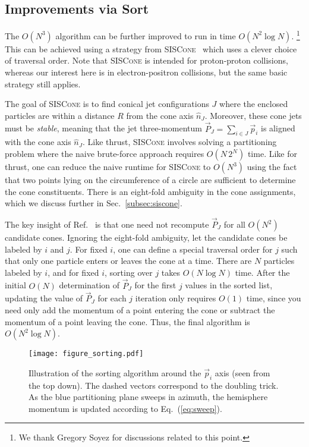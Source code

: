 \documentclass[aps,prd,twocolumn,superscriptaddress,preprintnumbers,nofootinbib,longbibliography,floatfix]{revtex4-1}
\DeclareRobustCommand{\Sec}[1]{Sec.~\ref{#1}}
\DeclareRobustCommand{\Eq}[1]{Eq.~(\ref{#1})}
\DeclareRobustCommand{\Ref}[1]{Ref.~\cite{#1}}
\begin{document}
\subsection{Improvements via Sort}
\label{sec:classical_sort}

The $O(N^3)$ algorithm can be further improved to run in time $O(N^2\log N)$.%
%
\footnote{We thank Gregory Soyez for discussions related to this point.}
%
This can be achieved using a strategy from \textsc{SISCone}~\cite{Salam:2007xv} which uses a clever choice of traversal order.
%
Note that \textsc{SISCone} is intended for proton-proton collisions, whereas our interest here is in electron-positron collisions, but the same basic strategy still applies.


The goal of \textsc{SISCone} is to find conical jet configurations $J$ where the enclosed particles are within a distance $R$ from the cone axis $\hat{n}_J$.
%
Moreover, these cone jets must be \emph{stable}, meaning that the jet three-momentum $\vec{P}_{J} = \sum_{i \in J} \vec{p}_i$ is aligned with the cone axis $\hat{n}_J$.
%
Like thrust, \textsc{SISCone} involves solving a partitioning problem where the naive brute-force approach requires $O(N \, 2^N)$ time.
%
Like for thrust, one can reduce the naive runtime for \textsc{SISCone} to $O(N^3)$ using the fact that two points lying on the circumference of a circle are sufficient to determine the cone constituents.
%
There is an eight-fold ambiguity in the cone assignments, which we discuss further in \Sec{subsec:siscone}.


The key insight of \Ref{Salam:2007xv} is that one need not recompute $\vec{P}_{J}$ for all $O(N^2)$ candidate cones.
%
Ignoring the eight-fold ambiguity, let the candidate cones be labeled by $i$ and $j$.
%
For fixed $i$, one can define a special traversal order for $j$ such that only one particle enters or leaves the cone at a time.
%
There are $N$ particles labeled by $i$, and for fixed $i$, sorting over $j$ takes $O(N \log N)$ time.
%
After the initial $O(N)$ determination of $\vec{P}_{J}$ for the first $j$ values in the sorted list, updating the value of $\vec{P}_{J}$ for each $j$ iteration only requires $O(1)$ time, since you need only add the momentum of a point entering the cone or subtract the momentum of a point leaving the cone.
%
Thus, the final algorithm is $O(N^2 \log N)$.


\begin{figure}
\texttt{[image: figure\_sorting.pdf]}
\caption{Illustration of the sorting algorithm around the $\vec{p}_i$ axis (seen from the top down).  The dashed vectors correspond to the doubling trick.  As the blue partitioning plane sweeps in azimuth, the hemisphere momentum is updated according to \Eq{eq:sweep}.}
\label{fig:sorting}
\end{figure}
\end{document}
